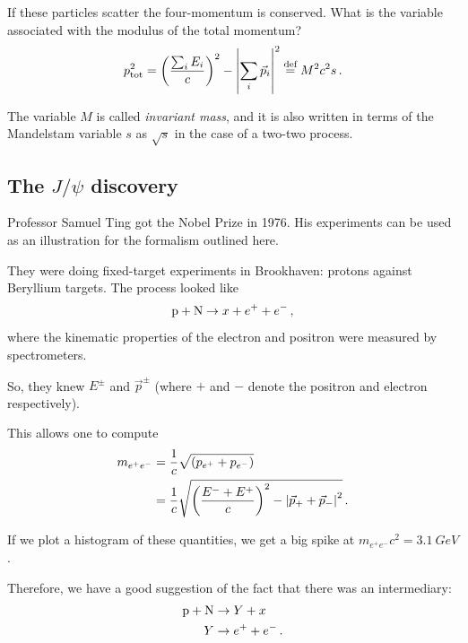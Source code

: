 \documentclass[main.tex]{subfiles}
\begin{document}
If these particles scatter the four-momentum is conserved. 
What is the variable associated with the modulus of the total momentum? 
%
\begin{align}
p _{\text{tot}}^2 = \qty(\frac{\sum _{i} E_i}{c})^2 - \abs{\sum _i \vec{p}_i}^2 \overset{\text{def}}{=} M^2 c^2s
\,.
\end{align}

The variable \(M\) is called \emph{invariant mass}, and it is also written in terms of the Mandelstam variable \(s\) as \(\sqrt{s}\) in the case of a two-two process.

\subsection{The \(J/\psi \) discovery}

Professor Samuel Ting got the Nobel Prize in 1976. 
His experiments can be used as an illustration for the formalism outlined here.

They were doing fixed-target experiments in Brookhaven: protons against Beryllium targets. 
The process looked like 
%
\begin{align}
\ce{p} + \ce{N} \to x + e^{+} + e^{-}
\,,
\end{align}
%
where the kinematic properties of the electron and positron were measured by spectrometers. 

So, they knew \(E^{\pm}\) and \(\vec{p}^{\pm}\) (where \(+\) and \(-\) denote the positron and electron respectively). 

This allows one to compute 
%
\begin{subequations}
\begin{align}
m_{e^{+} e^{-}} &= \frac{1}{c} \sqrt{(p_{e^{+}} + p_{e^{-}})}   \\
&= \frac{1}{c} \sqrt{\qty(\frac{E^{-} + E^{+}}{c})^2
- \abs{\vec{p}_+ + \vec{p}_-}^2} 
\,.
\end{align}
\end{subequations}

If we plot a histogram of these quantities, we get a big spike at \(m_{e^{+}e^{-}}c^2 = \SI{3.1}{GeV}\).

Therefore, we have a good suggestion of the fact that there was an intermediary: 
%
\begin{subequations}
\begin{align}
\ce{p} + \ce{N} &\to Y +x  \\
Y  &\to e^{+} + e^{-}
\,.
\end{align}
\end{subequations}
\end{document}
